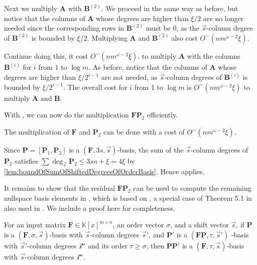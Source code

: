 \begin{pf}
Next we multiply $\mathbf{A}$ with $\mathbf{B}^{(2)}$. We proceed
in the same way as before, but notice that the columns of $\mathbf{A}$
whose degrees are higher than $\xi/2$ are no longer needed since
the corresponding rows in $\mathbf{B}^{(2)}$ must be 0, as the $\vec{s}$-column
degree of $\mathbf{B}^{(2)}$ is bounded by $\xi/2$. Multiplying
$\mathbf{A}$ and $\mathbf{B}^{(2)}$ also cost $O^{\sim}\left(nm^{\omega-2}\xi\right)$.

Continue doing this, it cost $O^{\sim}\left(nm^{\omega-2}\xi\right)$.
to multiply $\mathbf{A}$ with the columns $\mathbf{B}^{(i)}$ for
$i$ from $1$ to $\log m$.  As before, notice that the columns of
$\mathbf{A}$ whose degrees are higher than $\xi/2^{i-1}$ are not
needed, as $\vec{s}$-column degrees of $\mathbf{B}^{(i)}$ is bounded
by $\xi/2^{i-1}$. The overall cost for $i$ from 1 to $\log m$ is
$O^{\sim}\left(nm^{\omega-2}\xi\right)$ to multiply $\mathbf{A}$
and $\mathbf{B}$. 
\end{pf}
With , we can now do the
multiplication $\mathbf{F}\mathbf{P}_{2}$ efficiently.
\begin{cor}
\label{cor:multiplyingFP2}The multiplication of $\mathbf{F}$ and
$\mathbf{P}_{2}$ can be done with a cost of $O^{\sim}\left(nm^{\omega-2}\xi\right)$.\end{cor}
\begin{pf}
Since $\mathbf{P}=[\mathbf{P}_{1},\mathbf{P}_{2}]$ is a $(\mathbf{F},3s,\vec{s})$-basis,
the sum of the $\vec{s}$-column degrees of $\mathbf{P}_{2}$ satisfies
$\sum\deg_{\vec{s}}\mathbf{P}_{2}\le3sn+\xi=4\xi$ by \ref{lem:boundOfSumOfShiftedDegreesOfOrderBasis}.
Hence  applies.
\end{pf}
It remains to show that the residual $\mathbf{F}\mathbf{P}_{2}$ can
be used to compute the remaining nullspace basis elements in ,
which is based on , a
special case of Theorem 5.1 in \textbf{\citep{BL1997} }also used
in \citep{za2009}. We include a proof here for completeness.
\begin{lem}
\label{lem:continueComputingOrderBasis}For an input matrix $\mathbf{F}\in\mathbb{K}\left[x\right]^{m\times n}$,
an order vector $\sigma$, and a shift vector $\vec{s}$, if $\mathbf{P}$
is a $\left(\mathbf{F},\sigma,\vec{s}\right)$-basis with $\vec{s}$-column
degrees $\vec{s}'$, and $\mathbf{P}'$ is a $(\mathbf{F}\mathbf{P},\tau,\vec{s}')$
-basis with $\vec{s}'$-column degrees $\vec{s}"$ and its order $\tau\ge\sigma$,
then $\mathbf{P}\mathbf{P}'$ is a $(\mathbf{F},\tau,\vec{s})$-basis
with $\vec{s}$-column degrees $\vec{s}"$.\end{lem}
